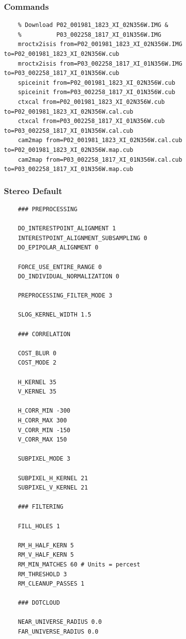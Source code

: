 \subsubsection*{Commands}

\begin{verbatim}
    % Download P02_001981_1823_XI_02N356W.IMG &
    %          P03_002258_1817_XI_01N356W.IMG
    mroctx2isis from=P02_001981_1823_XI_02N356W.IMG to=P02_001981_1823_XI_02N356W.cub
    mroctx2isis from=P03_002258_1817_XI_01N356W.IMG to=P03_002258_1817_XI_01N356W.cub
    spiceinit from=P02_001981_1823_XI_02N356W.cub
    spiceinit from=P03_002258_1817_XI_01N356W.cub
    ctxcal from=P02_001981_1823_XI_02N356W.cub to=P02_001981_1823_XI_02N356W.cal.cub
    ctxcal from=P03_002258_1817_XI_01N356W.cub to=P03_002258_1817_XI_01N356W.cal.cub
    cam2map from=P02_001981_1823_XI_02N356W.cal.cub to=P02_001981_1823_XI_02N356W.map.cub
    cam2map from=P03_002258_1817_XI_01N356W.cal.cub to=P03_002258_1817_XI_01N356W.map.cub
\end{verbatim}

\subsubsection*{Stereo Default}

\begin{verbatim}
    ### PREPROCESSING

    DO_INTERESTPOINT_ALIGNMENT 1
    INTERESTPOINT_ALIGNMENT_SUBSAMPLING 0
    DO_EPIPOLAR_ALIGNMENT 0

    FORCE_USE_ENTIRE_RANGE 0
    DO_INDIVIDUAL_NORMALIZATION 0

    PREPROCESSING_FILTER_MODE 3

    SLOG_KERNEL_WIDTH 1.5

    ### CORRELATION

    COST_BLUR 0
    COST_MODE 2

    H_KERNEL 35
    V_KERNEL 35

    H_CORR_MIN -300
    H_CORR_MAX 300
    V_CORR_MIN -150
    V_CORR_MAX 150

    SUBPIXEL_MODE 3

    SUBPIXEL_H_KERNEL 21
    SUBPIXEL_V_KERNEL 21

    ### FILTERING

    FILL_HOLES 1

    RM_H_HALF_KERN 5
    RM_V_HALF_KERN 5
    RM_MIN_MATCHES 60 # Units = percest
    RM_THRESHOLD 3
    RM_CLEANUP_PASSES 1

    ### DOTCLOUD

    NEAR_UNIVERSE_RADIUS 0.0
    FAR_UNIVERSE_RADIUS 0.0
\end{verbatim}

